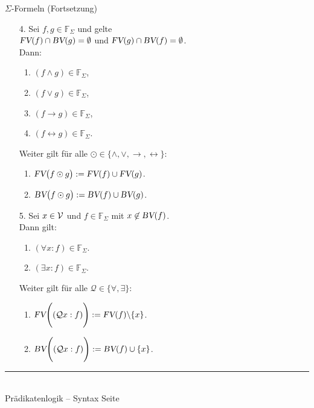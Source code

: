 \documentclass{slides}
\newcommand{\myrule}{\rule{20cm}{1mm}\\ }
\newcommand{\FV}{\textsl{FV}}
\newcommand{\BV}{\textsl{BV}}
\newcounter{mypage}
\begin{document}
\begin{slide}{}
\normalsize
\begin{center}
$\Sigma$-Formeln (Fortsetzung)
\end{center}
\vspace{0.5cm}

\footnotesize
\begin{enumerate}
\item[4.] Sei $f, g \in \mathbb{F}_\Sigma$ und gelte \\[0.3cm]
      \hspace*{1.3cm} $\FV(f) \cap \BV(g) = \emptyset$ \quad und \quad
                      $\FV(g) \cap \BV(f) = \emptyset$. \\[0.3cm]
      Dann:
      \begin{enumerate}
      \item $(f \wedge g) \in \mathbb{F}_\Sigma$,
      \item $(f \vee g) \in \mathbb{F}_\Sigma$,
      \item $(f \rightarrow g) \in \mathbb{F}_\Sigma$,
      \item $(f \leftrightarrow g) \in \mathbb{F}_\Sigma$.
      \end{enumerate}
      Weiter gilt f\"{u}r alle $\odot \in \{ \wedge, \vee, \rightarrow, \leftrightarrow \}$:
      \begin{enumerate}
      \item $\FV\bigl( f \odot g \bigr) := \FV(f) \cup \FV(g)$.
      \item $\BV\bigl( f \odot g \bigr) := \BV(f) \cup \BV(g)$.
      \end{enumerate}
\item[5.] Sei  $x \in {\cal V}$  und $f \in \mathbb{F}_\Sigma$ mit $x \not\in \BV(f)$. \\[0.3cm]
      Dann gilt:
      \begin{enumerate}
      \item $(\forall x : f) \in \mathbb{F}_\Sigma$.
      \item $(\exists x : f) \in \mathbb{F}_\Sigma$.
      \end{enumerate}
      Weiter gilt f\"{u}r alle $\mathcal{Q} \in \{ \forall, \exists \}$:
      \begin{enumerate}
      \item $\FV\Bigg( (\mathcal{Q} x : f) \Bigg) := \FV(f) \backslash \{x\}$.
      \item $\BV\Bigg( (\mathcal{Q} x : f) \Bigg) := \BV(f) \cup \{x\}$.  
      \end{enumerate}
\end{enumerate}


\vspace*{\fill}
\tiny \addtocounter{mypage}{1}
\myrule
Pr\"{a}dikatenlogik -- Syntax  \hspace*{\fill} Seite 
\end{slide}
\end{document}
